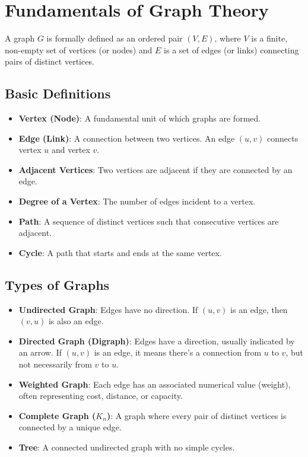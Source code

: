 \documentclass[11pt, a4paper]{article}
\begin{document}
\section{Fundamentals of Graph Theory}
A graph $G$ is formally defined as an ordered pair $(V, E)$, where $V$ is a finite, non-empty set of vertices (or nodes) and $E$ is a set of edges (or links) connecting pairs of distinct vertices.

\subsection{Basic Definitions}
\begin{itemize}[noitemsep,topsep=3pt,parsep=3pt,partopsep=0pt]
    \item \textbf{Vertex (Node)}: A fundamental unit of which graphs are formed.
    \item \textbf{Edge (Link)}: A connection between two vertices. An edge $(u,v)$ connects vertex $u$ and vertex $v$.
    \item \textbf{Adjacent Vertices}: Two vertices are adjacent if they are connected by an edge.
    \item \textbf{Degree of a Vertex}: The number of edges incident to a vertex.
    \item \textbf{Path}: A sequence of distinct vertices such that consecutive vertices are adjacent.
    \item \textbf{Cycle}: A path that starts and ends at the same vertex.
\end{itemize}

\subsection{Types of Graphs}
\begin{itemize}[noitemsep,topsep=3pt,parsep=3pt,partopsep=0pt]
    \item \textbf{Undirected Graph}: Edges have no direction. If $(u,v)$ is an edge, then $(v,u)$ is also an edge.
    \item \textbf{Directed Graph (Digraph)}: Edges have a direction, usually indicated by an arrow. If $(u,v)$ is an edge, it means there's a connection from $u$ to $v$, but not necessarily from $v$ to $u$.
    \item \textbf{Weighted Graph}: Each edge has an associated numerical value (weight), often representing cost, distance, or capacity.
    \item \textbf{Complete Graph ($K_n$)}: A graph where every pair of distinct vertices is connected by a unique edge.
    \item \textbf{Tree}: A connected undirected graph with no simple cycles.
\end{itemize}
\end{document}
